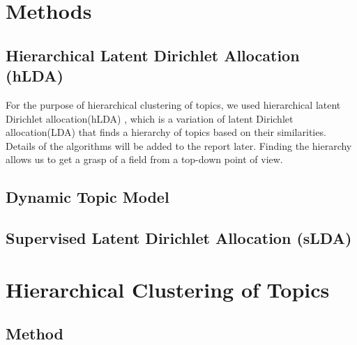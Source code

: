 \documentclass[DIV=calc, paper=a4, fontsize=11pt, twocolumn]{scrartcl}	 %
\begin{document}
\section*{Methods}
\subsection*{Hierarchical Latent Dirichlet Allocation (hLDA)}
For the purpose of hierarchical clustering of topics, we used hierarchical latent Dirichlet allocation(hLDA) \cite{1}, which is a variation of latent Dirichlet allocation(LDA) \cite{2} that finds a hierarchy of topics based on their similarities. Details of the algorithms will be added to the report later. Finding the hierarchy allows us to get a grasp of a field from a top-down point of view. 

\subsection*{Dynamic Topic Model}

\subsection*{Supervised Latent Dirichlet Allocation (sLDA)}

\section*{Hierarchical Clustering of Topics}



\subsection*{Method}

  
\end{document}

